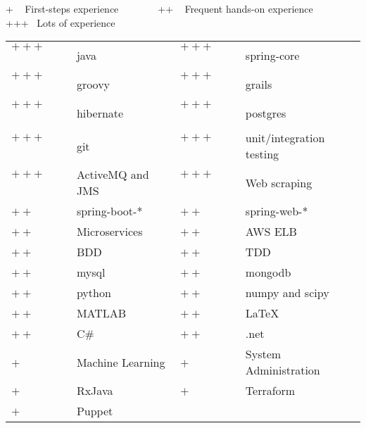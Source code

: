 
\newcommand{\plus}{$+~$~~~~}
\newcommand{\pplus}{$++~$~~~~}
\newcommand{\ppplus}{$+++$~~~~~}
\begin{cventries}
\cventry
{+ ~ First-steps experience ~~~  ~~~ ++ ~ Frequent hands-on experience ~~~  ~~~ +++ ~Lots of experience \vspace{0.1em}} %
{} %
{} %
{} %
{ %
\setlength{\tabcolsep}{3pt}
\begin{tabular}{  l l @{\hskip 1in} l l }
           \ppplus & java & \ppplus & spring-core \\ 
           \ppplus & groovy & \ppplus & grails  \\
           \ppplus & hibernate & \ppplus & postgres  \\                      
           \ppplus & git & \ppplus & unit/integration testing  \\
		   \ppplus & ActiveMQ and JMS & \ppplus & Web scraping\vspace{0.7em}\\
           \pplus & spring-boot-* & \pplus & spring-web-*  \\ 
           \pplus & Microservices & \pplus & AWS ELB  \\ 
           \pplus & BDD &\pplus & TDD \\ 
           \pplus & mysql &\pplus & mongodb \\ 
           \pplus & python  & \pplus & numpy and scipy \\ 
		   \pplus & MATLAB & \pplus & \LaTeX \\
		   \pplus & C\# & \pplus & .net \vspace{0.7em}   \\                   
           \plus & Machine Learning &\plus & System Administration \\
           \plus & RxJava & \plus & Terraform\\
		   \plus & Puppet 
\end{tabular}
}
\end{cventries}
